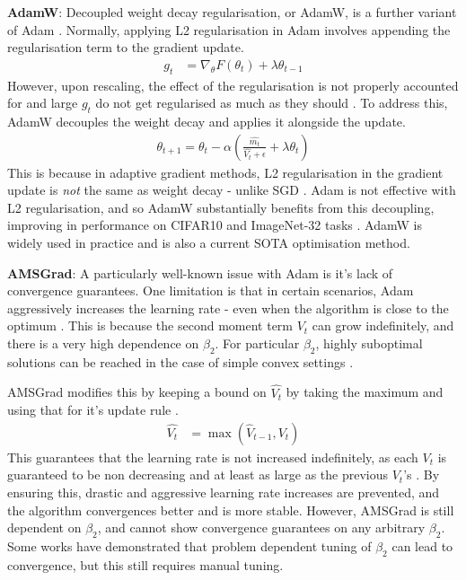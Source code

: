 \textbf{AdamW}: Decoupled weight decay regularisation, or AdamW, is a further variant of Adam \citep{loshchilov2017decoupled}. Normally, applying L2 regularisation in Adam involves appending the regularisation term to the gradient update.
\begin{align}
    g_t &= \nabla_{\theta} F(\theta_t) + \lambda \theta_{t-1}
\end{align}
However, upon rescaling, the effect of the regularisation is not properly accounted for and large $g_t$ do not get regularised as much as they should \citep{loshchilov2017decoupled}. To address this, AdamW decouples the weight decay and applies it alongside the update.
\begin{align}
    \theta_{t+1} = \theta_t - \alpha \left( \frac{\hat{m_t}}{\hat{V_t} + \epsilon} + \lambda \theta_t \right)
\end{align}
This is because in adaptive gradient methods, L2 regularisation in the gradient update is \textit{not} the same as weight decay - unlike SGD \citep{loshchilov2017decoupled}. Adam is not effective with L2 regularisation, and so AdamW substantially benefits from this decoupling, improving in performance on CIFAR10 and ImageNet-32 tasks \citep{loshchilov2017decoupled}. AdamW is widely used in practice and is also a current SOTA optimisation method.

\textbf{AMSGrad}: A particularly well-known issue with Adam is it's lack of convergence guarantees. One limitation is that in certain scenarios, Adam aggressively increases the learning rate - even when the algorithm is close to the optimum \citep{reddi2019convergence}. This is because the second moment term $V_t$ can grow indefinitely, and there is a very high dependence on $\beta_2$. For particular $\beta_2$, highly suboptimal solutions can be reached in the case of simple convex settings \citep{reddi2019convergence}.

AMSGrad modifies this by keeping a bound on $\hat{V_t}$ by taking the maximum and using that for it's update rule \citep{reddi2019convergence}.
\begin{align}
    \hat{V_{t}} &= \max(\hat{V}_{t-1}, V_t)
\end{align}
This guarantees that the learning rate is not increased indefinitely, as each $V_t$ is guaranteed to be non decreasing and at least as large as the previous $V_t$'s \citep{reddi2019convergence}. By ensuring this, drastic and aggressive learning rate increases are prevented, and the algorithm convergences better and is more stable. However, AMSGrad is still dependent on $\beta_2$, and cannot show convergence guarantees on any arbitrary $\beta_2$. Some works have demonstrated that problem dependent tuning of $\beta_2$ can lead to convergence, but this still requires manual tuning.


